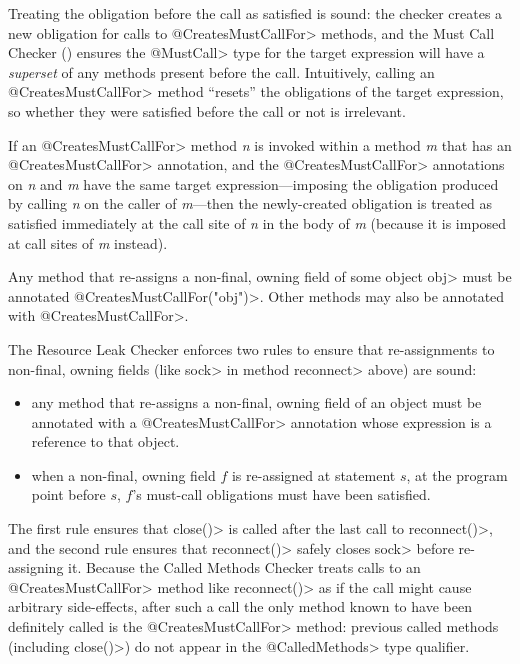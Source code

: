 Treating the obligation before the call as satisfied is sound: the
checker creates a new obligation for calls to \<@CreatesMustCallFor> methods,
and the Must Call Checker () ensures the
\<@MustCall> type for the target expression will have a \emph{superset} of any methods
present before the call. Intuitively, calling an \<@CreatesMustCallFor> method
``resets'' the obligations of the target expression, so whether they were satisfied before
the call or not is irrelevant.

If an \<@CreatesMustCallFor>
method \emph{n} is invoked within a method \emph{m} that has an \<@CreatesMustCallFor> annotation,
and the \<@CreatesMustCallFor> annotations on \emph{n} and \emph{m} have
the same target expression---imposing the obligation produced by calling \emph{n} on the caller of \emph{m}---then
the newly-created obligation is treated as satisfied immediately
at the call site of \emph{n} in the body of \emph{m} (because it is imposed at call sites of \emph{m}
instead).



Any method that re-assigns a non-final, owning field of some object \<obj>
must be annotated \<@CreatesMustCallFor("obj")>.
Other methods may also be annotated with \<@CreatesMustCallFor>.

The Resource Leak Checker enforces two rules to ensure that re-assignments
to non-final, owning fields (like \<sock> in method \<reconnect> above) are
sound:
\begin{itemize}
\item any method that re-assigns a non-final, owning field of an object
  must be annotated with a \<@CreatesMustCallFor> annotation
  whose expression is a reference to that object.
\item when a non-final, owning field $f$ is re-assigned at statement $s$,
  at the program point before $s$, $f$'s must-call obligations must have been satisfied.
\end{itemize}
\noindent
The first rule ensures that \<close()> is called after the last call
to \<reconnect()>, and the second rule ensures that \<reconnect()>
safely closes \<sock> before re-assigning it. Because the Called Methods Checker
treats calls to an \<@CreatesMustCallFor> method like \<reconnect()> as if the call might
cause arbitrary side-effects, after such a call the only method known to have been
definitely called is the \<@CreatesMustCallFor> method: previous called
methods (including \<close()>) do not appear in the \<@CalledMethods> type qualifier.

